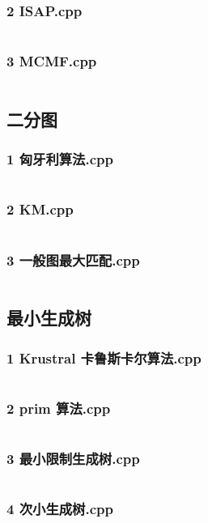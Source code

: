 \documentclass[a4paper,11pt]{article}
\begin{document}
\subsubsection{2 ISAP.cpp}
\inputminted[breaklines]{c++}{"D:/tmplz/templates/图论/Maxflow/2 ISAP.cpp"}
\subsubsection{3 MCMF.cpp}
\inputminted[breaklines]{c++}{"D:/tmplz/templates/图论/Maxflow/3 MCMF.cpp"}
\subsection{二分图}
\subsubsection{1 匈牙利算法.cpp}
\inputminted[breaklines]{c++}{"D:/tmplz/templates/图论/二分图/1 匈牙利算法.cpp"}
\subsubsection{2 KM.cpp}
\inputminted[breaklines]{c++}{"D:/tmplz/templates/图论/二分图/2 KM.cpp"}
\subsubsection{3 一般图最大匹配.cpp}
\inputminted[breaklines]{c++}{"D:/tmplz/templates/图论/二分图/3 一般图最大匹配.cpp"}
\subsection{最小生成树}
\subsubsection{1 Krustral 卡鲁斯卡尔算法.cpp}
\inputminted[breaklines]{c++}{"D:/tmplz/templates/图论/最小生成树/1 Krustral 卡鲁斯卡尔算法.cpp"}
\subsubsection{2 prim 算法.cpp}
\inputminted[breaklines]{c++}{"D:/tmplz/templates/图论/最小生成树/2 prim 算法.cpp"}
\subsubsection{3 最小限制生成树.cpp}
\inputminted[breaklines]{c++}{"D:/tmplz/templates/图论/最小生成树/3 最小限制生成树.cpp"}
\subsubsection{4 次小生成树.cpp}
\inputminted[breaklines]{c++}{"D:/tmplz/templates/图论/最小生成树/4 次小生成树.cpp"}
\end{document}

